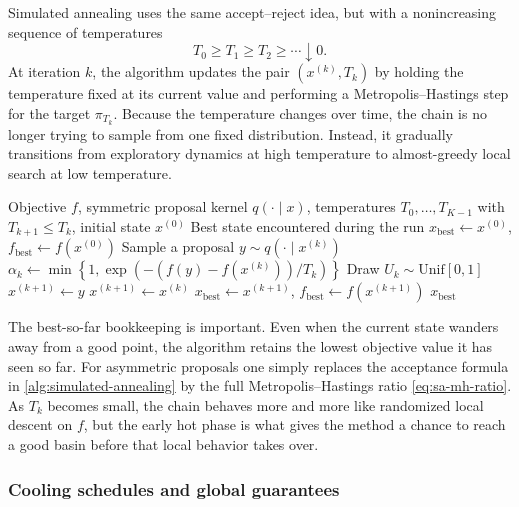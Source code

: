 Simulated annealing uses the same accept--reject idea, but with a nonincreasing sequence of temperatures
\[
  T_0 \ge T_1 \ge T_2 \ge \cdots \downarrow 0.
\]
At iteration $k$, the algorithm updates the pair $(x^{(k)},T_k)$ by holding the temperature fixed at its current value and performing a Metropolis--Hastings step for the target $\pi_{T_k}$.
Because the temperature changes over time, the chain is no longer trying to sample from one fixed distribution.
Instead, it gradually transitions from exploratory dynamics at high temperature to almost-greedy local search at low temperature.

\begin{algorithm}
  \caption{Random-walk simulated annealing}
  \label{alg:simulated-annealing}
  \begin{algorithmic}[1]
    \Require Objective $f$, symmetric proposal kernel $q(\cdot\mid x)$, temperatures $T_0,\dots,T_{K-1}$ with $T_{k+1}\le T_k$, initial state $x^{(0)}$
    \Ensure Best state encountered during the run
    \State $x_{\mathrm{best}} \gets x^{(0)}$, $f_{\mathrm{best}} \gets f(x^{(0)})$
      \State Sample a proposal $y \sim q(\cdot\mid x^{(k)})$
      \State $\alpha_k \gets \min\!\left\{1,\exp\!\left(-(f(y)-f(x^{(k)}))/T_k\right)\right\}$
      \State Draw $U_k \sim \mathrm{Unif}[0,1]$
        \State $x^{(k+1)} \gets y$
      \Else
        \State $x^{(k+1)} \gets x^{(k)}$
      \EndIf
        \State $x_{\mathrm{best}} \gets x^{(k+1)}$, $f_{\mathrm{best}} \gets f(x^{(k+1)})$
      \EndIf
    \EndFor
    \State \Return $x_{\mathrm{best}}$
  \end{algorithmic}
\end{algorithm}

The best-so-far bookkeeping is important.
Even when the current state wanders away from a good point, the algorithm retains the lowest objective value it has seen so far.
For asymmetric proposals one simply replaces the acceptance formula in \cref{alg:simulated-annealing} by the full Metropolis--Hastings ratio \eqref{eq:sa-mh-ratio}.
As $T_k$ becomes small, the chain behaves more and more like randomized local descent on $f$, but the early hot phase is what gives the method a chance to reach a good basin before that local behavior takes over.

\subsubsection{Cooling schedules and global guarantees}
\label{subsubsec:sa-schedules}

